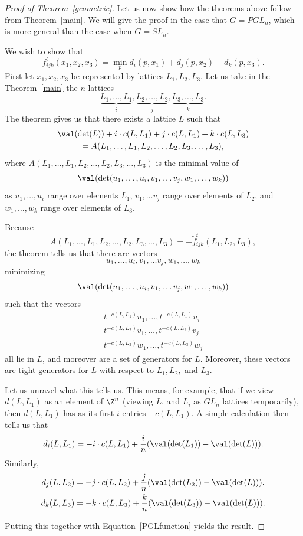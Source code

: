 \begin{proof}[Proof of Theorem~\ref{geometric}] Let us now show how the theorems above follow from Theorem~\ref{main}. We will give the proof in the case that $G=PGL_n$, which is more general than the case when $G=SL_n$.




We wish to show that
\[
f_{ijk}^t (x_1,x_2,x_3) = \min_{p} d_i(p,x_1) + d_j(p,x_2) + d_k(p,x_3).
\]
First let $x_1, x_2, x_3$ be represented by lattices $L_1, L_2, L_3.$ Let us take in the Theorem~\ref{main} the $n$ lattices
\[
 \underbrace{L_1,\ldots,L_1}_{i}, \underbrace{L_2,\ldots,L_2}_{j}, \underbrace{L_3,\ldots,L_3}_{k}.
\]
The theorem gives us that there exists a lattice $L$ such that 
\begin{multline}\label{latticeeqn}
\val(\det(L)) + i \cdot c(L,L_1) + j \cdot c(L,L_1) + k \cdot c(L,L_3)\\
= A(L_1, \dots, L_1, L_2, \dots, L_2, L_3, \dots, L_3),
\end{multline}
where $A(L_1, \dots, L_1, L_2, \dots, L_2, L_3, \dots, L_3)$ is the minimal value of
\[
\val(\det(u_1, \dots, u_i, v_1, \dots v_j, w_1, \dots, w_k))
\]
as $u_1, \dots, u_i$ range over elements $L_1$, $v_1, \dots v_j$ range over elements of $L_2$, and $w_1, \dots, w_k$ range over elements of $L_3$.

Because
\[
A(L_1, \dots, L_1, L_2, \dots, L_2, L_3, \dots, L_3)=-\tilde{f}_{ijk}^t (L_1,L_2,L_3),
\]
the theorem tells us that there are vectors
\[
u_1, \dots, u_i, v_1, \dots v_j, w_1, \dots, w_k
\]
minimizing
\[
\val(\det(u_1, \dots, u_i, v_1, \dots v_j, w_1, \dots, w_k))
\]
such that the vectors
\begin{gather*}
t^{-c(L,L_1)}u_1, \dots, t^{-c(L,L_1)}u_i
\\
t^{-c(L,L_2)}v_1, \dots, t^{-c(L,L_2)}v_j
\\
t^{-c(L,L_3)}w_1, \dots, t^{-c(L,L_3)}w_j
\end{gather*}
all lie in $L$, and moreover are a set of generators for $L$. Moreover, these vectors are tight generators for $L$ with respect to $L_1, L_2,$ and $L_3$.

Let us unravel what this tells us. This means, for example, that if we view $d(L,L_1)$ as an element of $\Z^n$ (viewing $L$, and $L_i$ as $GL_n$ lattices temporarily), then $d(L,L_1)$ has as its first $i$ entries $-c(L,L_1)$. A simple calculation then tells us that 
\[
d_i(L,L_1) = -i \cdot c(L,L_1)+\frac{i}{n}(\val(\det(L_1))-\val(\det(L))).
\]
Similarly,
\begin{align*}
d_j(L,L_2) &= -j \cdot c(L,L_2)+\frac{j}{n}(\val(\det(L_2))-\val(\det(L))).
\\
d_k(L,L_3) &= -k \cdot c(L,L_3)+\frac{k}{n}(\val(\det(L_3))-\val(\det(L))).
\end{align*}

Putting this together with Equation~\eqref{PGLfunction} yields the result.
\end{proof}

